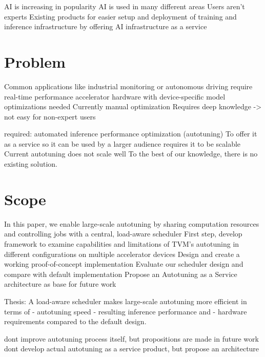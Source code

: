 AI is increasing in popularity
AI is used in many different areas
Users aren't experts
Existing products for easier setup and deployment of training and inference infrastructure by offering AI infrastructure as a service

\section{Problem}
Common applications like industrial monitoring or autonomous driving require real-time performance
accelerator hardware with device-specific model optimizations needed
Currently manual optimization
Requires deep knowledge -> not easy for non-expert users

required: automated inference performance optimization (autotuning)
To offer it as a service so it can be used by a larger audience requires it to be scalable
Current autotuning does not scale well
To the best of our knowledge, there is no existing solution.

\section{Scope}
In this paper, we enable large-scale autotuning by sharing computation resources and controlling jobs with a central, load-aware scheduler
First step, develop framework to examine capabilities and limitations of TVM's autotuning in different configurations on multiple accelerator devices
Design and create a working proof-of-concept implementation
Evaluate our scheduler design and compare with default implementation
Propose an Autotuning as a Service architecture as base for future work

Thesis:
A load-aware scheduler makes large-scale autotuning more efficient in terms of
- autotuning speed
- resulting inference performance and 
- hardware requirements
compared to the default design.

dont improve autotuning process itself, but propositions are made in future work
dont develop actual autotuning as a service product, but propose an architecture
